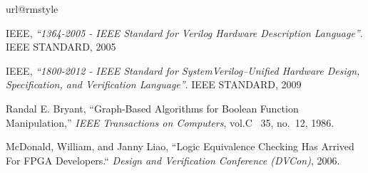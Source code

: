 \begin{thebibliography}{10}
\providecommand{\url}[1]{#1}
\csname url@rmstyle\endcsname
\providecommand{\newblock}{\relax}
\providecommand{\bibinfo}[2]{#2}
\providecommand\BIBentrySTDinterwordspacing{\spaceskip=0pt\relax}
\providecommand\BIBentryALTinterwordstretchfactor{4}
\providecommand\BIBentryALTinterwordspacing{\spaceskip=\fontdimen2\font plus
\BIBentryALTinterwordstretchfactor\fontdimen3\font minus
  \fontdimen4\font\relax}
\providecommand\BIBforeignlanguage[2]{{%
\expandafter\ifx\csname l@#1\endcsname\relax
\typeout{** WARNING: IEEEtran.bst: No hyphenation pattern has been}%
\typeout{** loaded for the language `#1'. Using the pattern for}%
\typeout{** the default language instead.}%
\else
\language=\csname l@#1\endcsname
\fi
#2}}

  IEEE,
  \emph{``1364-2005 - IEEE Standard for Verilog Hardware Description
  Language''}.
	IEEE STANDARD,
	2005

  IEEE,
	\emph{``1800-2012 - IEEE Standard for SystemVerilog--Unified Hardware Design,
  Specification, and Verification Language''}.
	IEEE STANDARD,
	2009

Randal E. Bryant,
  ``Graph-Based Algorithms for Boolean Function Manipulation,'' \emph{IEEE Transactions on Computers}, vol.C ~35, no.~12, 1986.

McDonald, William, and Janny Liao,
	``Logic Equivalence Checking Has Arrived For FPGA Developers.`` \emph{Design and Verification Conference (DVCon)}, 2006.
%
%
%
%
%


\end{thebibliography}
